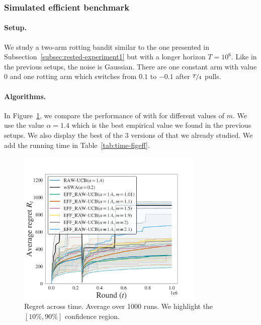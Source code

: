 \subsubsection{Simulated efficient benchmark}
\paragraph{Setup.} We study a two-arm rotting bandit similar to the one presented in Subsection~\ref{subsec:rested-experiment1} but with a longer horizon $T = 10^6$. Like in the previous setups, the noise is Gaussian. There are one constant arm with value $0$ and one rotting arm which switches from $0.1$ to $-0.1$ after $\nicefrac{T}{4}$ pulls.

\paragraph{Algorithms.} In Figure~\ref{fig:rested-eff}, we compare the performance of \RAWUCB with \EFFRAW for different values of $m$. We use the value $\alpha = 1.4$ which is the best empirical value we found in the previous setups. We also display the best of the 3 versions of \wSWA that we already studied. We add the running time in Table~\ref{tab:time-figeff}. 
\begin{figure}[h!]
\centering
\includegraphics[width = 0.8\textwidth]{2.1Rested/fig/fig_eff.pdf}
\caption{Regret across time. Average over 1000 runs. We highlight the $\left[10\%, 90\%\right]$ confidence region.} 
\label{fig:rested-eff}
\end{figure}

